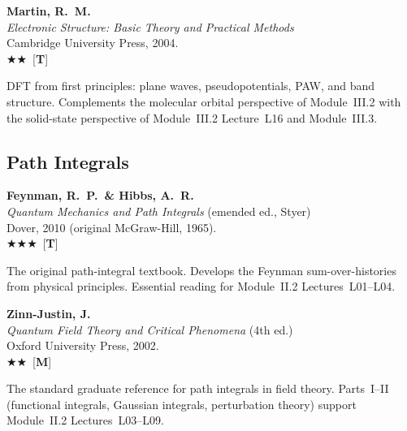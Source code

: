 \documentclass[11pt,a4paper]{article}
\newcommand{\essential}{$\bigstar\bigstar\bigstar$}
\newcommand{\recommended}{$\bigstar\bigstar$}
\newenvironment{bibentry}[1]{\begin{tcolorbox}[entrybox=#1,top=4pt,bottom=4pt]}{\end{tcolorbox}\smallskip}
\begin{document}
\begin{bibentry}{t4light}
\textbf{Martin, R.~M.}\\
\textit{Electronic Structure: Basic Theory and Practical Methods}\\
Cambridge University Press, 2004.\\[3pt]
\recommended\ [\textbf{T}]\\[3pt]
\begin{tcolorbox}[annotbox]
DFT from first principles: plane waves, pseudopotentials, PAW, and band structure.
Complements the molecular orbital perspective of Module~III.2 with the solid-state
perspective of Module~III.2 Lecture~L16 and Module~III.3.
\end{tcolorbox}
\end{bibentry}

\subsection{Path Integrals}

\begin{bibentry}{t4light}
\textbf{Feynman, R.~P.\ \& Hibbs, A.~R.}\\
\textit{Quantum Mechanics and Path Integrals} (emended ed., Styer)\\
Dover, 2010 (original McGraw-Hill, 1965).\\[3pt]
\essential\ [\textbf{T}]\\[3pt]
\begin{tcolorbox}[annotbox]
The original path-integral textbook. Develops the Feynman sum-over-histories
from physical principles. Essential reading for Module~II.2 Lectures~L01--L04.
\end{tcolorbox}
\end{bibentry}

\begin{bibentry}{t4light}
\textbf{Zinn-Justin, J.}\\
\textit{Quantum Field Theory and Critical Phenomena} (4th ed.)\\
Oxford University Press, 2002.\\[3pt]
\recommended\ [\textbf{M}]\\[3pt]
\begin{tcolorbox}[annotbox]
The standard graduate reference for path integrals in field theory. Parts~I--II
(functional integrals, Gaussian integrals, perturbation theory) support
Module~II.2 Lectures~L03--L09.
\end{tcolorbox}
\end{bibentry}
\end{document}
